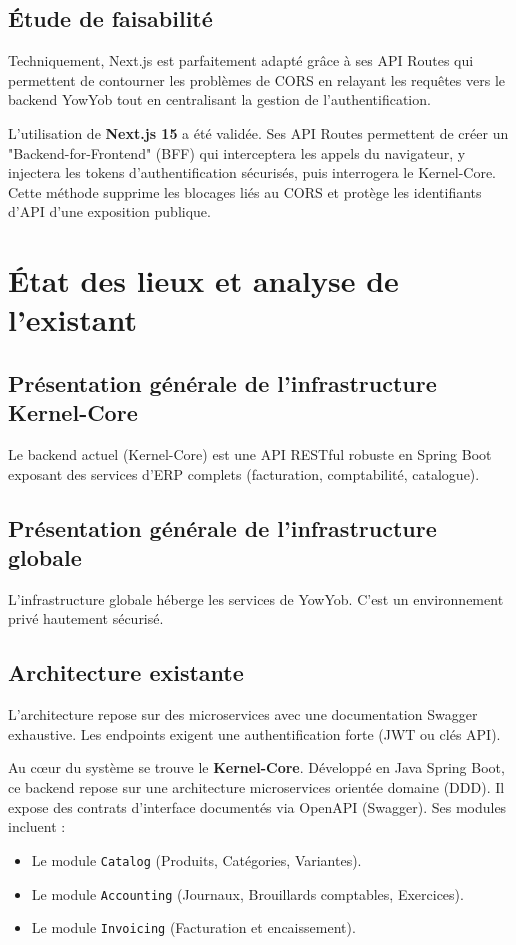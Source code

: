 \documentclass[12pt, a4paper]{report}
\begin{document}
\section{Étude de faisabilité}
Techniquement, Next.js est parfaitement adapté grâce à ses API Routes qui permettent de contourner les problèmes de CORS en relayant les requêtes vers le backend YowYob tout en centralisant la gestion de l'authentification.

L'utilisation de \textbf{Next.js 15} a été validée. Ses API Routes permettent de créer un "Backend-for-Frontend" (BFF) qui interceptera les appels du navigateur, y injectera les tokens d'authentification sécurisés, puis interrogera le Kernel-Core. Cette méthode supprime les blocages liés au CORS et protège les identifiants d'API d'une exposition publique.
\chapter{État des lieux et analyse de l'existant}
\section{Présentation générale de l'infrastructure Kernel-Core}
Le backend actuel (Kernel-Core) est une API RESTful robuste en Spring Boot exposant des services d'ERP complets (facturation, comptabilité, catalogue). 

\section{Présentation générale de l'infrastructure globale}
L'infrastructure globale héberge les services de YowYob. C'est un environnement privé hautement sécurisé. 

\section{Architecture existante}
L'architecture repose sur des microservices avec une documentation Swagger exhaustive. Les endpoints exigent une authentification forte (JWT ou clés API).

Au cœur du système se trouve le \textbf{Kernel-Core}. Développé en Java Spring Boot, ce backend repose sur une architecture microservices orientée domaine (DDD). Il expose des contrats d'interface documentés via OpenAPI (Swagger). Ses modules incluent :
\begin{itemize}
    \item Le module \texttt{Catalog} (Produits, Catégories, Variantes).
    \item Le module \texttt{Accounting} (Journaux, Brouillards comptables, Exercices).
    \item Le module \texttt{Invoicing} (Facturation et encaissement).
\end{itemize}
\end{document}
